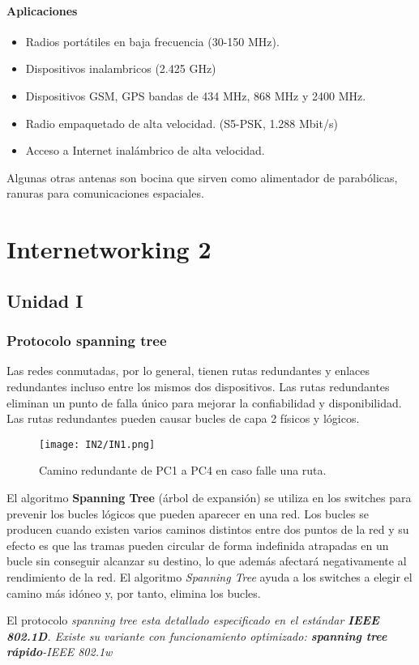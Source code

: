 \documentclass[
	12pt, %
	fleqn, %
	a4paper, %
	oneside, %
]{LegrandOrangeBook}
\begin{document}
\subsection{Aplicaciones}
\begin{itemize}
\item Radios portátiles en baja frecuencia (30-150 MHz).
\item Dispositivos inalambricos (2.425 GHz)
\item Dispositivos GSM, GPS bandas de 434 MHz, 868 MHz y 2400 MHz.
\item Radio empaquetado de alta velocidad. (S5-PSK, 1.288 Mbit/s)
\item Acceso a Internet inalámbrico de alta velocidad.
\end{itemize}
\begin{notation}
Algunas otras antenas son bocina que sirven como alimentador de parabólicas, ranuras para comunicaciones espaciales.
\end{notation}
\part{Internetworking 2}

\chapter{Unidad I}
\section{Protocolo spanning tree}
Las redes conmutadas, por lo general, tienen rutas  redundantes y enlaces redundantes incluso entre los  mismos dos dispositivos. Las rutas redundantes eliminan un punto de falla único  para mejorar la confiabilidad y disponibilidad. Las rutas redundantes pueden causar bucles de capa 2  físicos y lógicos.
\begin{figure}[H]
\centering
\texttt{[image: IN2/IN1.png]}
\caption{Camino redundante de PC1 a PC4 en caso falle una ruta.}
\end{figure}
El algoritmo \textbf{Spanning Tree} (árbol de expansión) se utiliza en los switches para prevenir los bucles lógicos que pueden aparecer en una red. Los bucles se producen cuando existen varios caminos distintos entre dos puntos de la red y su efecto es que las tramas pueden circular de forma indefinida atrapadas en un bucle sin conseguir alcanzar su destino, lo que además afectará negativamente al rendimiento de la red. El algoritmo \textit{Spanning Tree} ayuda a los switches a elegir el camino más idóneo y, por tanto, elimina los bucles.
\begin{notation}
El protocolo \textit{spanning tree esta detallado especificado en el estándar \textbf{IEEE 802.1D}. Existe su variante con funcionamiento optimizado: \textbf{spanning tree rápido}-IEEE 802.1w}
\end{notation}
\end{document}

